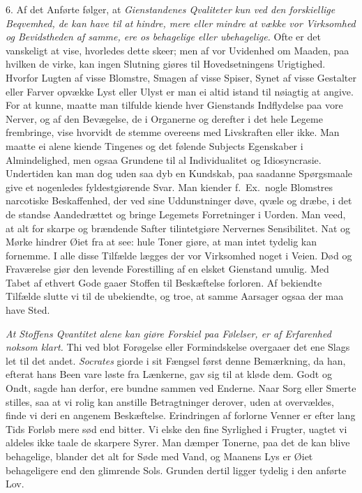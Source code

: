 \documentclass[12pt,a4paper]{article}
\newcommand{\opage}[1]{\marginnote{\footnotesize\textit{[#1]}}}
\begin{document}
6. Af det Anførte følger, at \emph{Gienstandenes Qvaliteter kun ved den forskiellige
Beqvemhed, de kan have til at hindre, mere eller mindre at vække vor Virksomhed og
Bevidstheden af samme, ere os behagelige eller ubehagelige.} Ofte er det vanskeligt at
vise, hvorledes dette skeer; men af vor Uvidenhed om
\opage{200} Maaden, paa hvilken de virke, kan ingen Slutning giøres til Hovedsetningens Urigtighed.
Hvorfor Lugten af visse Blomstre, Smagen af visse Spiser, Synet af visse Gestalter eller
Farver opvække Lyst eller Ulyst er man ei altid istand til nøiagtig at angive. For at
kunne, maatte man tilfulde kiende hver Gienstands Indflydelse paa vore Nerver, og af den
Bevægelse, de i Organerne og derefter i det hele Legeme frembringe, vise hvorvidt de
stemme overeens med Livskraften eller ikke. Man maatte ei alene kiende Tingenes og det
følende Subjects Egenskaber i Almindelighed, men ogsaa Grundene til al Individualitet og
Idiosyncrasie. Undertiden kan man dog uden saa dyb en Kundskab, paa saadanne Spørgsmaale
give et nogenledes fyldestgiørende Svar. Man kiender f.~Ex.\ nogle Blomstres narcotiske
Beskaffenhed, der ved sine Uddunstninger døve, qvæle og dræbe, i det de standse
Aandedrættet og bringe Legemets Forretninger i Uorden. Man veed, at alt for skarpe og
brændende Safter tilintetgiøre Nervernes Sensibilitet. Nat og Mørke hindrer Øiet fra at
see: hule Toner giøre, at man intet tydelig kan fornemme. I alle disse Tilfælde lægges der
vor Virksomhed noget i Veien. Død og Fraværelse giør den levende Forestilling af en elsket
Gienstand umulig. Med Tabet af ethvert Gode gaaer Stoffen til Beskæftelse forloren. Af
bekiendte Tilfælde slutte vi til de ubekiendte, og troe, at samme Aarsager ogsaa der maa
have Sted.

\opage{201} \emph{At Stoffens Qvantitet alene kan giøre Forskiel paa Følelser, er af Erfarenhed noksom
klart.} Thi ved blot Forøgelse eller Formindskelse overgaaer det ene Slags let til det
andet. \emph{Socrates} giorde i sit Fængsel først denne Bemærkning, da han, efterat hans
Been vare løste fra Lænkerne, gav sig til at kløde dem. Godt og Ondt, sagde han derfor,
ere bundne sammen ved Enderne. Naar Sorg eller Smerte stilles, saa at vi rolig kan anstille
Betragtninger derover, uden at overvældes, finde vi deri en angenem Beskæftelse.
Erindringen af forlorne Venner er efter lang Tids Forløb mere sød end bitter. Vi elske den
fine Syrlighed i Frugter, uagtet vi aldeles ikke taale de skarpere Syrer. Man dæmper
Tonerne, paa det de kan blive behagelige, blander det alt for Søde med Vand, og Maanens
Lys er Øiet behageligere end den glimrende Sols. Grunden dertil ligger tydelig i den
anførte Lov.
\end{document}
